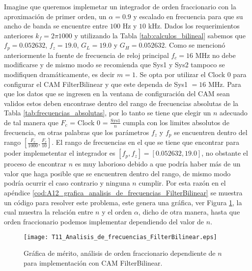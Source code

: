 	Imagine que queremos implemetar un integrador de orden fraccionario con la aproximación de primer orden, un $\alpha = 0.9$ y escalado en frecuencia para que su ancho de banda se encuentre entre $100$ Hz y $10$ kHz. Dados los requerimientos anteriores $k_{f} = 2 \pi 1000$ y utilizando la Tabla \ref{tab:calculos_bilineal} sabemos que $f_{p} = 0.052632$, $f_{z} = 19.0$, $G_{L} = 19.0$ y $G_{H} = 0.052632$. Como se mencionó anteriormente la fuente de frecuencia de reloj principal $f_{c} = 16$ MHz no debe modificarse y de mismo modo se recomienda que Sys1 y Sys2 tampoco se modifiquen dramáticamente, es decir $m = 1$. Se opta por utilizar el Clock 0 para configurar el CAM FilterBilinear y que este dependa de Sys1 $=16$ MHz. Para que los datos que se ingresen en la ventana de configuración del CAM sean validos estos deben encontrase dentro del rango de frecuencias absolutas de la Tabla \ref{tab:frecuencias_absolutas}, por lo tanto se tiene que elegir un $n$ adecuado de tal manera que $F_{c}$ = Clock 0 = $\frac{\mathrm{Sys1}}{n}$ cumpla con los limites absolutos de frecuencia, en otras palabras que los parámetros $f_{z}$ y $f_{p}$ se encuentren dentro del rango $[\frac{F_{c}}{1000}, \frac{F_{c}}{10}]$. El rango de frecuencias en el que se tiene que encontrar para poder implemetentar el integrador es $[f_{p},f_{z}] = [0.052632, 19.0]$, no obstante el proceso de encontrar $n$ es muy laborioso debido a que podría haber más de un valor que haga posible que se encuentren dentro del rango, de mismo modo podría ocurrir el caso contrario y ninguna $n$ cumplir. Por esta razón en el apéndice \ref{cod:A12_grafica_analisis_de_frecuencias_FilterBilinear} se muestra un código para resolver este problema, este genera una gráfica, ver Figura \ref{fig:T11_Analisis_de_frecuencias_FilterBilinear}, la cual muestra la relación entre $n$ y el orden $\alpha$, dicho de otra manera, hasta que orden fraccionario podemos implementar dependiendo del valor de $n$.

	\begin{figure}[hbtp]
		\caption{Gráfica de mérito, análisis de orden fraccionario dependiente de $n$ para implementación con CAM FilterBilinear.} 
		\label{fig:T11_Analisis_de_frecuencias_FilterBilinear}
		\centering
		\texttt{[image: T11\_Analisis\_de\_frecuencias\_FilterBilinear.eps]}
	\end{figure}

